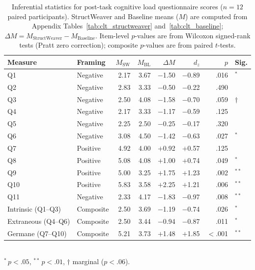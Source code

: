 \documentclass[manuscript,review,anonymous]{acmart}
\begin{document}
\begin{table}[t]
\centering
\caption{Inferential statistics for post-task cognitive load questionnaire scores ($n=12$ paired participants). StructWeaver and Baseline means ($M$) are computed from Appendix Tables~\ref{tab:clt_structweaver} and~\ref{tab:clt_baseline}; $\Delta M = M_{\text{StructWeaver}} - M_{\text{Baseline}}$. Item-level $p$-values are from Wilcoxon signed-rank tests (Pratt zero correction); composite $p$-values are from paired $t$-tests.}
\label{tab:clt_inferential}
\small
\setlength{\tabcolsep}{4pt}
\begin{tabular}{l l r r r r r l}
\toprule
\textbf{Measure} & \textbf{Framing} & \textbf{$M_{\text{SW}}$} & \textbf{$M_{\text{BL}}$} & \textbf{$\Delta M$} & \textbf{$d_z$} & \textbf{$p$} & \textbf{Sig.} \\
\midrule
Q1 & Negative & 2.17 & 3.67 & $-$1.50 & $-$0.89 & .016 & $^{*}$ \\
Q2 & Negative & 2.83 & 3.33 & $-$0.50 & $-$0.22 & .490 & \\
Q3 & Negative & 2.50 & 4.08 & $-$1.58 & $-$0.70 & .059 & $\dagger$ \\
Q4 & Negative & 2.17 & 3.33 & $-$1.17 & $-$0.59 & .125 & \\
Q5 & Negative & 2.25 & 2.50 & $-$0.25 & $-$0.17 & .320 & \\
Q6 & Negative & 3.08 & 4.50 & $-$1.42 & $-$0.63 & .027 & $^{*}$ \\
Q7 & Positive & 4.92 & 4.00 & $+$0.92 & $+$0.57 & .125 & \\
Q8 & Positive & 5.08 & 4.08 & $+$1.00 & $+$0.74 & .049 & $^{*}$ \\
Q9 & Positive & 5.00 & 3.25 & $+$1.75 & $+$1.23 & .002 & $^{**}$ \\
Q10 & Positive & 5.83 & 3.58 & $+$2.25 & $+$1.21 & .006 & $^{**}$ \\
Q11 & Negative & 2.33 & 4.17 & $-$1.83 & $-$0.97 & .008 & $^{**}$ \\
\midrule
Intrinsic (Q1--Q3) & Composite & 2.50 & 3.69 & $-$1.19 & $-$0.74 & .026 & $^{*}$ \\
Extraneous (Q4--Q6) & Composite & 2.50 & 3.44 & $-$0.94 & $-$0.87 & .011 & $^{*}$ \\
Germane (Q7--Q10) & Composite & 5.21 & 3.73 & $+$1.48 & $+$1.85 & $<$.001 & $^{**}$ \\
\bottomrule
\end{tabular}
\\[4pt]
\footnotesize{$^{*}\,p<.05$, $^{**}\,p<.01$, $\dagger$ marginal ($p<.06$).}
\end{table}
\end{document}
